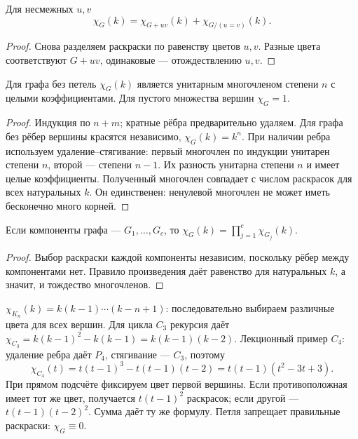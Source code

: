 \begin{cor}
Для несмежных \(u,v\)
\[
 \chi_G(k)=\chi_{G+uv}(k)+\chi_{G/(u=v)}(k).
\]
\end{cor}
\begin{proof}
Снова разделяем раскраски по равенству цветов \(u,v\).
Разные цвета соответствуют \(G+uv\), одинаковые — отождествлению \(u,v\).
\end{proof}
\begin{theorem}[Полиномиальность]
Для графа без петель \(\chi_G(k)\) является унитарным многочленом
степени \(n\) с целыми коэффициентами. Для пустого множества вершин \(\chi_G=1\).
\end{theorem}
\begin{proof}
Индукция по \(n+m\); кратные рёбра предварительно удаляем.
Для графа без рёбер вершины красятся независимо, \(\chi_G(k)=k^n\).
При наличии ребра используем удаление–стягивание: первый многочлен
по индукции унитарен степени \(n\), второй — степени \(n-1\).
Их разность унитарна степени \(n\) и имеет целые коэффициенты.
Полученный многочлен совпадает с числом раскрасок для всех натуральных \(k\).
Он единственен: ненулевой многочлен не может иметь бесконечно много корней.
\end{proof}
\begin{lemma}
Если компоненты графа — \(G_1,\ldots,G_c\), то
\(\chi_G(k)=\prod_{j=1}^c\chi_{G_j}(k)\).
\end{lemma}
\begin{proof}
Выбор раскраски каждой компоненты независим, поскольку рёбер между
компонентами нет. Правило произведения даёт равенство для натуральных \(k\),
а значит, и тождество многочленов.
\end{proof}
\begin{example}
\(\chi_{K_n}(k)=k(k-1)\cdots(k-n+1)\): последовательно выбираем различные
цвета для всех вершин. Для цикла \(C_3\) рекурсия даёт
\(\chi_{C_3}=k(k-1)^2-k(k-1)=k(k-1)(k-2)\).
Лекционный пример \(C_4\): удаление ребра даёт \(P_4\), стягивание — \(C_3\), поэтому
\[
\chi_{C_4}(t)=t(t-1)^3-t(t-1)(t-2)=t(t-1)(t^2-3t+3).
\]
При прямом подсчёте фиксируем цвет первой вершины. Если противоположная
имеет тот же цвет, получается \(t(t-1)^2\) раскрасок; если другой —
\(t(t-1)(t-2)^2\). Сумма даёт ту же формулу.
Петля запрещает правильные раскраски: \(\chi_G\equiv0\).
\end{example}
